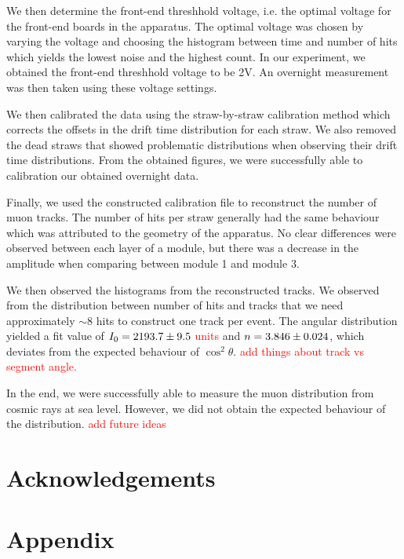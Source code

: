 \documentclass[a4paper]{report}
\numberwithin{equation}{section}
\begin{document}
We then determine the front-end threshhold voltage, i.e. the optimal voltage for the front-end boards in the apparatus. 
The optimal voltage was chosen by varying the voltage and choosing the histogram between time and number of hits 
which yields the lowest noise and the highest count. In our experiment, we obtained the front-end threshhold voltage to be 
2V. An overnight measurement was then taken using these voltage settings.\par 

We then calibrated the data using the straw-by-straw calibration method which corrects the offsets in the drift time distribution
for each straw. We also removed the dead straws that showed problematic distributions when observing their drift time distributions. 
From the obtained figures, we were successfully able to calibration our obtained overnight data. \par 

Finally, we used the constructed calibration file to reconstruct the number of muon tracks. The number of hits per straw generally 
had the same behaviour which was attributed to the geometry of the apparatus. No clear differences were observed between each layer 
of a module, but there was a decrease in the amplitude when comparing between module 1 and module 3. \par 

We then observed the histograms from the reconstructed tracks. We observed from the distribution between number of hits and tracks 
that we need approximately $\sim 8$ hits to construct one track per event. The angular distribution yielded a fit value of 
$I_0 = \num{2193.7 \pm 9.5}$ \textcolor{red}{units} and $n = \num{3.846 \pm 0.024}$, which deviates from the expected behaviour of 
$\cos^2 \theta$. \textcolor{red}{add things about track vs segment angle.}

In the end, we were successfully able to measure the muon distribution from cosmic rays at sea level. However, we did not obtain
the expected behaviour of the distribution. \textcolor{red}{add future ideas}


\chapter{Acknowledgements}

\printbibliography

\chapter{Appendix} \label{chap:appendix}
\end{document}
